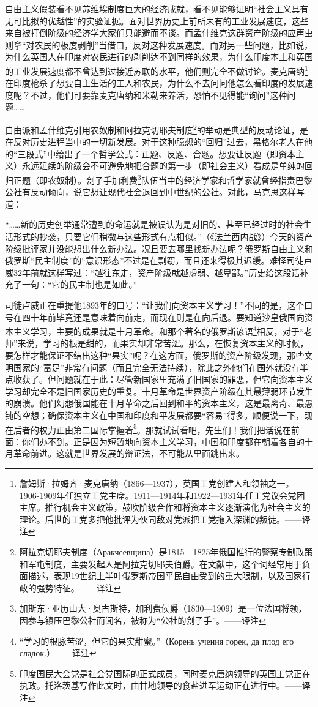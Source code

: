 \documentclass[UTF8, 12pt, a4paper]{ctexrep}
\begin{document}
自由主义假装看不见苏维埃制度巨大的经济成就，看不见能够证明“社会主义具有无可比拟的优越性”的实验证据。面对世界历史上前所未有的工业发展速度，这些来自被打倒阶级的经济学大家们只能避而不谈。而孟什维克这群资产阶级的应声虫则拿“对农民的极度剥削”当借口，反对这种发展速度。而对另一些问题，比如说，为什么英国人在印度对农民进行的剥削达不到同样的效果，为什么印度本土和英国的工业发展速度都不曾达到过接近苏联的水平，他们则完全不做讨论。麦克唐纳\footnote{詹姆斯·拉姆齐·麦克唐纳（1866—1937），英国工党创建人和领袖之一。1906-1909年任独立工党主席。1911—1914年和1922—1931年任工党议会党团主席。推行机会主义政策，鼓吹阶级合作和将资本主义逐渐演化为社会主义的理论。后世的工党多把他批评为伙同敌对党派把工党拖入深渊的叛徒。——译注}在印度枪杀了想要自主生活的工人和农民，为什么不去问问他怎么看印度的发展速度呢？不过，他们可要靠麦克唐纳和米勒来养活，恐怕不见得能“询问”这种问题……

自由派和孟什维克引用农奴制和阿拉克切耶夫制度\footnote{阿拉克切耶夫制度（Аракчеевщина）是1815—1825年俄国推行的警察专制政策和军屯制度，主要发起人是阿拉克切耶夫伯爵。在文献中，这个词经常用于负面描述，表现19世纪上半叶俄罗斯帝国平民自由受到的重大限制，以及国家行政的强势特征。——译注}的举动是典型的反动论证，是在反对历史进程当中的一切新发展。对于这种臆想的“回归”过去，黑格尔老人在他的“三段式”中给出了一个哲学公式：正题、反题、合题。想要让反题（即资本主义）永远延续的阶级会不可避免地把合题的第一步（即社会主义）看成是单纯的回归正题（即农奴制）。刽子手加利费\footnote{加斯东·亚历山大·奥古斯特，加利费侯爵（1830—1909）是一位法国将领，因参与镇压巴黎公社而闻名，被称为“公社的刽子手”。——译注}队伍当中的经济学家和哲学家就曾经指责巴黎公社有反动倾向，说它想让现代社会退回到中世纪的公社。对此，马克思这样写道：

“……新的历史创举通常遭到的命运就是被误认为是对旧的、甚至已经过时的社会生活形式的抄袭，只要它们稍微与这些形式有点相似。”（《法兰西内战》）今天的资产阶级批评家并没能想出什么新办法。况且要去哪里找新办法呢？俄罗斯自由主义和俄罗斯“民主制度”的“意识形态”不过是在剽窃，而且还来得极其迟缓。难怪司徒卢威32年前就这样写过：“越往东走，资产阶级就越虚弱、越卑鄙。”历史给这段话补充了一句：“它的民主制也是如此。”

司徒卢威正在重提他1893年的口号：“让我们向资本主义学习！”不同的是，这个口号在四十年前毕竟还是意味着向前走，而现在则是在向后退。要知道沙皇俄国向资本主义学习，主要的成果就是十月革命。和那个著名的俄罗斯谚语\footnote{“学习的根脉苦涩，但它的果实甜蜜。”（Корень учения горек, да плод его сладок.）——译注}相反，对于“老师”来说，学习的根是甜的，而果实却非常苦涩。那么，在恢复资本主义的时候，要怎样才能保证不结出这种“果实”呢？在这方面，俄罗斯的资产阶级发现，那些文明国家的“富足”非常有问题（而且完全无法持续），除此之外他们在国外就没有半点收获了。但问题就在于此：尽管新国家里充满了旧国家的罪恶，但它向资本主义学习却完全不是旧国家历史的重复。十月革命是世界资产阶级在其最薄弱环节发生的崩溃。他们幻想俄国能在十月革命之后回到和平的资本主义，这是最离奇、最愚钝的空想；确保资本主义在中国和印度和平发展都要“容易”得多。顺便说一下，现在后者的权力正由第二国际掌握着\footnote{印度国民大会党是社会党国际的正式成员，同时麦克唐纳领导的英国工党正在执政。托洛茨基写作此文时，由甘地领导的食盐进军运动正在进行中。——译注}。那就试试看吧，先生们！我们把话说在前面：你们办不到。正是因为短暂地向资本主义学习，中国和印度都在朝着各自的十月革命前进。这就是世界发展的辩证法，不可能从里面跳出来。
\end{document}
